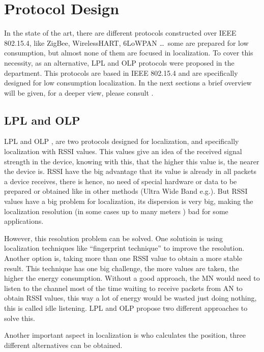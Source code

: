 \chapter{Protocol Design}
\label{chap:protocoldesign}

In the state of the art, there are different protocols constructed over \ac{IEEE} 802.15.4, like ZigBee, WirelessHART, 6LoWPAN \ldots \ some
are prepared for low consumption, but almost none of them are focused in localization. To cover this necessity, as an alternative, 
\ac{LPL} and \ac{OLP} \cite{LPLandOLP} protocols were proposed in the department. This protocols are based in 
\ac{IEEE} 802.15.4 and are specifically designed for low consumption localization. In the next sections a brief overview will be given, 
for a deeper view, please consult \cite{LPLandOLP}.

\section{\ac{LPL} and \ac{OLP}}

\ac{LPL} and \ac{OLP} \cite{LPLandOLP}, are two protocols designed for localization, and specifically localization with \ac{RSSI} 
values. This values give an idea of the received signal strength in the device, knowing with this, that the higher this value is,
the nearer the device is. \ac{RSSI} have the big advantage that its value is already in all packets a device receives, there
is hence, no need of special hardware or data to be prepared or obtained like in other methods (Ultra Wide Band e.g.). But \ac{RSSI} 
values have a big problem for localization, its dispersion is very big, making the localization resolution (in some cases up to 
many meters \cite{fingerprint}) bad for some applications. 

However, this resolution problem can be solved. One solutioin is using localization techniques like ``fingerprint 
technique'' \cite{fingerprint} to improve the resolution. Another option is, taking more than one \ac{RSSI} value to obtain a more stable 
result. This technique has one big challenge, the more values are taken, the higher the energy consumption. Without a good approach, 
the \ac{MN} would need to listen to the channel most of the time waiting to receive packets from \ac{AN} to obtain \ac{RSSI} values, 
this way a lot of energy would be wasted just doing nothing, this is called idle listening. \ac{LPL} and \ac{OLP} propose two different 
approaches to solve this.

Another important aspect in localization is who calculates the position, three different alternatives can be obtained.

